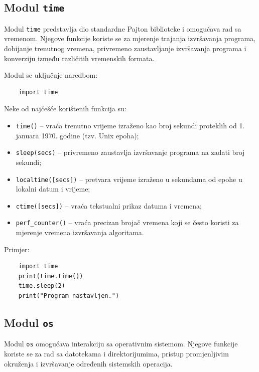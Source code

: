 \subsection{Modul \texttt{time}}

Modul \texttt{time} predstavlja dio standardne Pajton biblioteke i omogućava rad sa vremenom. Njegove funkcije koriste se za mjerenje trajanja izvršavanja programa, dobijanje trenutnog vremena, privremeno zaustavljanje izvršavanja programa i konverziju između različitih vremenskih formata.

Modul se uključuje naredbom:
\begin{verbatim}
	import time
\end{verbatim}

Neke od najčešće korištenih funkcija su:

\begin{itemize}
	\item \texttt{time()} -- vraća trenutno vrijeme izraženo kao broj sekundi proteklih od 1. januara 1970. godine (tzv. Unix epoha);
	
	\item \texttt{sleep(secs)} -- privremeno zaustavlja izvršavanje programa na zadati broj sekundi;
	
	\item \texttt{localtime([secs])} -- pretvara vrijeme izraženo u sekundama od epohe u lokalni datum i vrijeme;
	
	\item \texttt{ctime([secs])} -- vraća tekstualni prikaz datuma i vremena;
	
	\item \texttt{perf\_counter()} -- vraća precizan brojač vremena koji se često koristi za mjerenje vremena izvršavanja algoritama.
	
\end{itemize}

Primjer:

\begin{verbatim}
	import time
	print(time.time())
	time.sleep(2)
	print("Program nastavljen.")
\end{verbatim}

\subsection{Modul \texttt{os}}

Modul \texttt{os} omogućava interakciju sa operativnim sistemom. Njegove funkcije koriste se za rad sa datotekama i direktorijumima, pristup promjenljivim okruženja i izvršavanje određenih sistemskih operacija.

